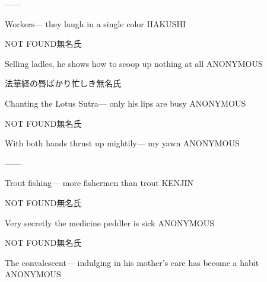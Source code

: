 \begin{haiku}
   ---\hfill{---}

    \vin{} Workers---
    \vin{} \vin{} they laugh
    \vin{} \vin{} \vin{} in a single color \hspace{\fill} HAKUSHI
\end{haiku}

\begin{haiku}
    {NOT FOUND}\hfill{\FH 無名氏}

    \vin{} Selling ladles,
    \vin{} \vin{} he shows how to scoop up
    \vin{} \vin{} \vin{} nothing at all \hspace{\fill} ANONYMOUS
\end{haiku}

\begin{haiku}
    {法華経の唇ばかり忙しき}\hfill{\FH 無名氏}

    \vin{} Chanting the Lotus Sutra---
    \vin{} \vin{} only his lips
    \vin{} \vin{} \vin{} are busy \hspace{\fill} ANONYMOUS
\end{haiku}

\begin{haiku}
    {NOT FOUND}\hfill{\FH 無名氏}

    \vin{} With both hands
    \vin{} \vin{} thrust up mightily---
    \vin{} \vin{} \vin{} my yawn \hspace{\fill} ANONYMOUS
\end{haiku}

\begin{haiku}
   ---\hfill{---}

    \vin{} Trout fishing---
    \vin{} \vin{} more fishermen
    \vin{} \vin{} \vin{} than trout \hspace{\fill} KENJIN
\end{haiku}

\begin{haiku}
    {NOT FOUND}\hfill{\FH 無名氏}

    \vin{} Very secretly
    \vin{} \vin{} the medicine peddler
    \vin{} \vin{} \vin{} is sick \hspace{\fill} ANONYMOUS
\end{haiku}

\begin{haiku}
    {NOT FOUND}\hfill{\FH 無名氏}

    \vin{} The convalescent---
    \vin{} \vin{} indulging in his mother's care
    \vin{} \vin{} \vin{} has become a habit \hspace{\fill} ANONYMOUS
\end{haiku}

